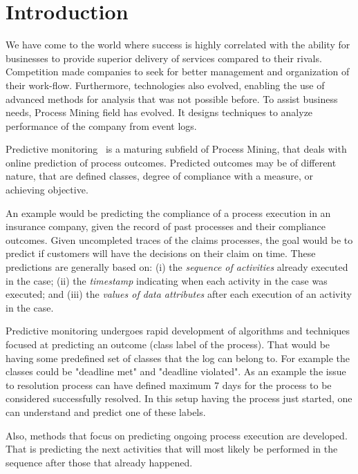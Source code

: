 

\section{Introduction} %
\label{sec:introduction}


We have come to the world where success is highly correlated with the ability for businesses to provide superior  delivery of services compared to their rivals. Competition made companies to seek for better management and organization of their work-flow. Furthermore, technologies also evolved, enabling the use of advanced methods for analysis that was not possible before. To assist business needs, Process Mining field has evolved. It designs techniques to analyze performance of the company from event logs.  

Predictive monitoring~\cite{Maggi:CAiSE2014} is a maturing subfield of Process Mining, that deals with online prediction of process outcomes. Predicted outcomes may be of different nature, that are defined classes, degree of compliance with a measure, or achieving objective.

An example would be predicting the compliance of a process execution in an insurance company, given the record of past processes and their compliance outcomes. Given uncompleted traces of the claims processes, the goal would be to predict if customers will have the decisions on their claim on time. These predictions are generally based on: (i) the \emph{sequence of activities} already executed in the case; (ii) the \emph{timestamp} indicating when each activity in the case was executed; and (iii) the \emph{values of data attributes} after each execution of an activity in the case.



Predictive monitoring undergoes rapid development of algorithms and techniques focused at predicting an outcome (class label of the process). That would be having some predefined set of classes that the log can belong to. For example the classes could be "deadline met" and "deadline violated". As an example the issue to resolution process can have defined maximum 7 days for the process to be considered successfully resolved. In this setup having the process just started, one can understand and predict one of these labels. 

Also, methods that focus on predicting ongoing process execution are developed. That is predicting the next activities that will most likely be performed in the sequence after those that already happened. 

